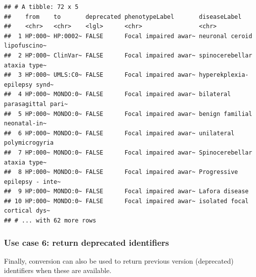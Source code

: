 \documentclass[9pt,a4paper,]{extarticle}
\newenvironment{Shaded}{\begin{snugshade}}{\end{snugshade}}
\newcommand{\CommentTok}[1]{\textcolor[rgb]{0.56,0.35,0.01}{\textit{#1}}}
\newcommand{\DataTypeTok}[1]{\textcolor[rgb]{0.13,0.29,0.53}{#1}}
\newcommand{\KeywordTok}[1]{\textcolor[rgb]{0.13,0.29,0.53}{\textbf{#1}}}
\newcommand{\NormalTok}[1]{#1}
\newcommand{\OperatorTok}[1]{\textcolor[rgb]{0.81,0.36,0.00}{\textbf{#1}}}
\newcommand{\StringTok}[1]{\textcolor[rgb]{0.31,0.60,0.02}{#1}}
\begin{document}
\begin{Shaded}
\end{Shaded}

\begin{verbatim}
## # A tibble: 72 x 5
##    from    to       deprecated phenotypeLabel       diseaseLabel                
##    <chr>   <chr>    <lgl>      <chr>                <chr>                       
##  1 HP:000~ HP:0002~ FALSE      Focal impaired awar~ neuronal ceroid lipofuscino~
##  2 HP:000~ ClinVar~ FALSE      Focal impaired awar~ spinocerebellar ataxia type~
##  3 HP:000~ UMLS:C0~ FALSE      Focal impaired awar~ hyperekplexia-epilepsy synd~
##  4 HP:000~ MONDO:0~ FALSE      Focal impaired awar~ bilateral parasagittal pari~
##  5 HP:000~ MONDO:0~ FALSE      Focal impaired awar~ benign familial neonatal-in~
##  6 HP:000~ MONDO:0~ FALSE      Focal impaired awar~ unilateral polymicrogyria   
##  7 HP:000~ MONDO:0~ FALSE      Focal impaired awar~ Spinocerebellar ataxia type~
##  8 HP:000~ MONDO:0~ FALSE      Focal impaired awar~ Progressive epilepsy - inte~
##  9 HP:000~ MONDO:0~ FALSE      Focal impaired awar~ Lafora disease              
## 10 HP:000~ MONDO:0~ FALSE      Focal impaired awar~ isolated focal cortical dys~
## # ... with 62 more rows
\end{verbatim}

\hypertarget{use-case-6-return-deprecated-identifiers}{%
\subsubsection{Use case 6: return deprecated identifiers}\label{use-case-6-return-deprecated-identifiers}}

Finally, conversion can also be used to return previous version (deprecated) identifiers when these are available.
\end{document}
